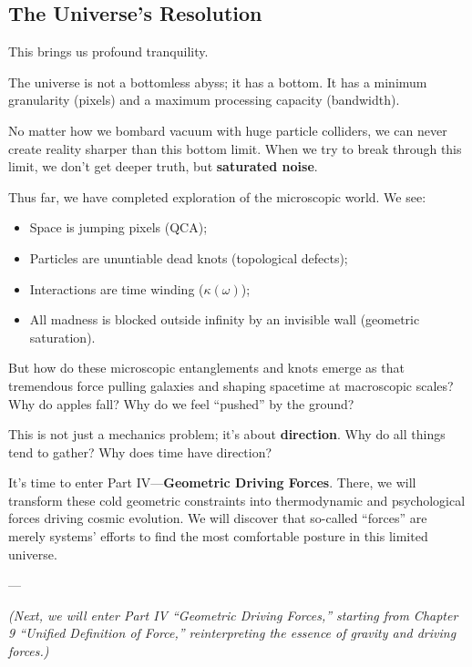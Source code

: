 \subsection{The Universe's Resolution}

This brings us profound tranquility.

The universe is not a bottomless abyss; it has a bottom. It has a minimum granularity (pixels) and a maximum processing capacity (bandwidth).

No matter how we bombard vacuum with huge particle colliders, we can never create reality sharper than this bottom limit. When we try to break through this limit, we don't get deeper truth, but \textbf{saturated noise}.

Thus far, we have completed exploration of the microscopic world. We see:

\begin{itemize}
\item Space is jumping pixels (QCA);

\item Particles are ununtiable dead knots (topological defects);

\item Interactions are time winding ($\kappa(\omega)$);

\item All madness is blocked outside infinity by an invisible wall (geometric saturation).
\end{itemize}

But how do these microscopic entanglements and knots emerge as that tremendous force pulling galaxies and shaping spacetime at macroscopic scales? Why do apples fall? Why do we feel ``pushed'' by the ground?

This is not just a mechanics problem; it's about \textbf{direction}. Why do all things tend to gather? Why does time have direction?

It's time to enter Part IV---\textbf{Geometric Driving Forces}. There, we will transform these cold geometric constraints into thermodynamic and psychological forces driving cosmic evolution. We will discover that so-called ``forces'' are merely systems' efforts to find the most comfortable posture in this limited universe.

---

\textit{(Next, we will enter Part IV ``Geometric Driving Forces,'' starting from Chapter 9 ``Unified Definition of Force,'' reinterpreting the essence of gravity and driving forces.)}

